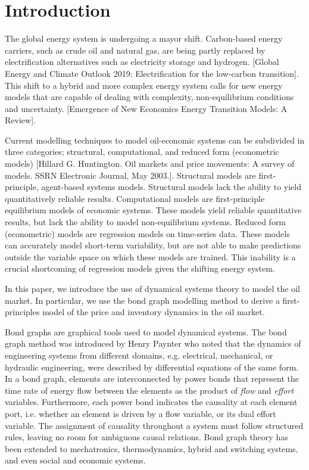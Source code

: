 \section{Introduction}
\label{sec: intro}




The global energy system is undergoing a mayor shift. Carbon-based energy carriers, such as crude oil and natural gas, are being partly replaced by electrification alternatives such as electricity storage and hydrogen. [Global Energy and Climate Outlook 2019: Electrification for the low-carbon transition]. 
This shift to a hybrid and more complex energy system calls for new energy models that are capable of dealing with complexity, non-equilibrium conditions and uncertainty. [Emergence of New Economics Energy Transition Models: A Review].

 
Current modelling techniques to model oil-economic systems can be subdivided in three categories; structural, computational, and reduced form (econometric models) [Hillard G. Huntington. Oil markets and price movements: A survey of models. SSRN Electronic Journal, May 2003.]. Structural models are first-principle, agent-based systems models. Structural models lack the ability to yield quantitatively reliable results. 
Computational models are first-principle equilibrium models of economic systems.
These models yield reliable quantitative results, but lack the ability to model non-equilibrium systems. 
Reduced form (econometric) models are regression models on time-series data.
These models can accurately model short-term variability, but are not able to make predictions outside the variable space on which these models are trained.
This inability is a crucial shortcoming of regression models given the shifting energy system.

In this paper, we introduce the use of dynamical systems theory to model the oil market.
In particular, we use the bond graph modelling method to derive a first-principles model of the price and inventory dynamics in the oil market.



Bond graphs are graphical tools used to model dynamical systems.
The bond graph method was introduced by Henry Paynter who noted that the dynamics of engineering systems from different domains, e.g. electrical, mechanical, or hydraulic engineering, were described by differential equations of the same form.
In a bond graph, elements are interconnected by power bonds that represent the time rate of energy flow between the elements as the product of \textit{flow} and \textit{effort} variables.
Furthermore, each power bond indicates the causality at each element port, i.e. whether an element is driven by a {flow} variable, or its dual {effort} variable. 
The assignment of causality throughout a system must follow structured rules, leaving no room for ambiguous causal relations.
Bond graph theory has been extended to mechatronics, thermodynamics, hybrid and switching systems, and even social and economic systems.


